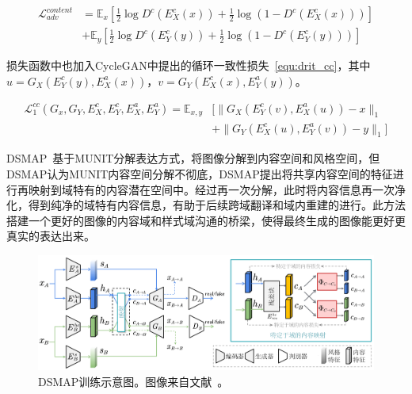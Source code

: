 \begin{equation}
\label{equ:drit_adv}
\begin{aligned}
\mathcal{L}_{adv}^{content} & = \mathbb{E}_x[\frac{1}{2}\log D^c(E_X^c(x))+\frac{1}{2}\log(1-D^c(E_X^c(x)))] \\
& + \mathbb{E}_y[\frac{1}{2}\log D^c(E_Y^c(y))+\frac{1}{2}\log(1-D^c(E_Y^c(y)))] 
\end{aligned}
\end{equation}

损失函数中也加入CycleGAN中提出的循环一致性损失~\ref{equ:drit_cc}，其中$u=G_X(E_Y^c(y),E_X^a(x))$，$v=G_Y(E_X^c(x),E_Y^a(y))$。%

\begin{equation}
\label{equ:drit_cc}
\begin{aligned}
\mathcal{L}_1^{cc}(G_x,G_Y,E_X^c,E_Y^c,E_X^a,E_Y^a) = \mathbb{E}_{x,y}&[\parallel G_X(E_Y^c(v),E_X^a(u))-x \parallel_1 \\
& + \parallel G_Y(E_X^c(u),E_Y^a(v))-y \parallel_1]
\end{aligned}
\end{equation}

DSMAP~\cite{chang2020domain}基于MUNIT分解表达方式，将图像分解到内容空间和风格空间，但DSMAP认为MUNIT内容空间分解不彻底，DSMAP提出将共享内容空间的特征进行再映射到域特有的内容潜在空间中。经过再一次分解，此时将内容信息再一次净化，得到纯净的域特有内容信息，有助于后续跨域翻译和域内重建的进行。此方法搭建一个更好的图像的内容域和样式域沟通的桥梁，使得最终生成的图像能更好更真实的表达出来。

\begin{figure}[ht]
    \centering
	\includegraphics[width=\textwidth]{figures/DSMAP.pdf}
	\caption{DSMAP训练示意图。图像来自文献~\cite{chang2020domain}。}
	\label{fig:dsmap}
\end{figure}


